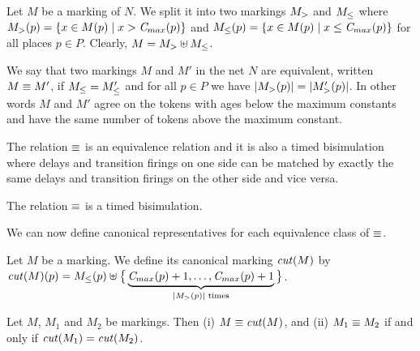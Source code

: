 Let $M$ be a marking of $N$. We split it into 
two markings $M_{>}$ and $M_{\leq}$ where 
$M_{>} (p)=\left\{ x\in M(p) \mid x>\mathit{C}_{max}(p) \right\}$ 
and $M_{\leq} (p)=\allowbreak\left\{ x\in M(p) \mid 
x\allowbreak\leq\allowbreak \mathit{C}_{max}(p) \right\}$
for all places $p \in P$. Clearly,
$M = M_{>} \uplus M_{\leq}$.

We say that two markings $M$ and $M'$ in the net $N$ are equivalent, 
written $M \equiv M^{\prime}$, 
if $M_{\leq}=M_{\leq}^{\prime}$
and for all $p \in P$ we have
$|M_{>} (p)|=|M_{>}^{\prime}(p)|$.
In other words $M$ and $M'$ agree on the tokens with ages below the
maximum constants and have the same number of tokens above the maximum
constant.

The relation $\equiv$ is an equivalence relation and it is
also a timed bisimulation 
where delays and transition firings on one side can be matched by
exactly the same delays and transition firings on the other side
and vice versa. %

\begin{theorem}
\label{thm:bisim}
  The relation $\equiv$ is a timed bisimulation.
\end{theorem}

We can now define canonical representatives for each
equivalence class of $\equiv$. 

\begin{definition}[Cut]
\label{def:cut}
Let $M$ be a marking.
We define its canonical marking $\mathit{cut}(M)$ by 
$\mathit{cut}(M)(p)= M_{\leq}(p)\uplus \big\{ \underbrace{ \mathit{C}_{max}(p)+1,\dots ,\mathit{C}_{max}(p)+1 }_{|M_{>}(p)| \text{ times}} \big\}$.
\end{definition}

\begin{lemma}
\label{lemma:canon}
Let $M$, $M_1$ and $M_2$ be markings. Then
(i) $M \equiv \mathit{cut}(M)$, and (ii)
$M_1 \equiv M_2$ if and only if $\mathit{cut}(M_1)=\mathit{cut}(M_2)$.
\end{lemma}

